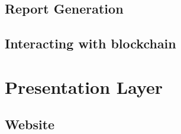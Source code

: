 \subsection{Report Generation}
\subsection{Interacting with blockchain}
\section{Presentation Layer}
\subsection{Website}